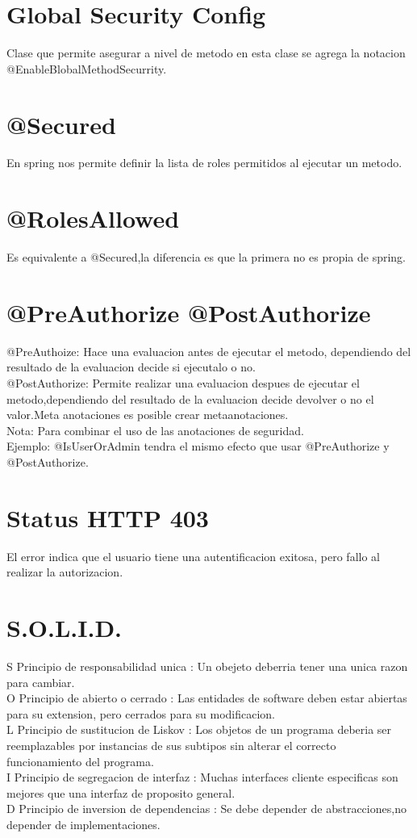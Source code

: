 \section{Global Security Config}
Clase que permite asegurar a nivel de metodo en esta clase se agrega la notacion @EnableBlobalMethodSecurrity.
\section{@Secured}
En spring nos permite definir la lista de roles permitidos al ejecutar un metodo.
\section{@RolesAllowed}
Es equivalente a @Secured,la diferencia es que la primera no es propia de spring.
\section{@PreAuthorize @PostAuthorize}
@PreAuthoize: Hace una evaluacion antes de ejecutar el metodo, dependiendo del resultado de la evaluacion decide si ejecutalo o no.\\
@PostAuthorize: Permite realizar una evaluacion despues de ejecutar el metodo,dependiendo del resultado de la evaluacion decide devolver o no el valor.Meta anotaciones es posible crear metaanotaciones.\\
Nota: Para combinar el uso de las anotaciones de seguridad.\\Ejemplo: @IsUserOrAdmin tendra el mismo efecto que usar 
@PreAuthorize y @PostAuthorize.
\section{Status HTTP 403}
El error indica que el usuario tiene una autentificacion exitosa, pero fallo al realizar la autorizacion.
\section{S.O.L.I.D.}
S Principio de responsabilidad unica : Un obejeto deberria tener una unica razon para cambiar. \\
O Principio de abierto o cerrado : Las entidades de software deben estar abiertas para su extension, pero cerrados para su modificacion.\\
L Principio de sustitucion de Liskov : Los objetos de un programa deberia ser reemplazables por instancias de sus subtipos
sin alterar el correcto funcionamiento del programa. \\
I Principio de segregacion de interfaz : Muchas interfaces cliente especificas son mejores que una interfaz de proposito general.\\
D Principio de inversion de dependencias : Se debe depender de abstracciones,no depender de implementaciones.
